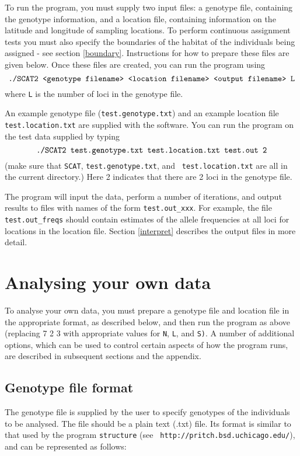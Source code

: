 \documentclass[11pt,titlepage,times,letterpaper]{article}
\begin{document}
To run the program, you must supply two input files: a genotype file,
containing the genotype information, and a location file, containing
information on the latitude and longitude of sampling locations. To
perform continuous assignment tests you must also specify the
boundaries of the habitat of the individuals being assigned - see
section \ref{boundary}.  Instructions for how to prepare these files
are given below. Once these files are created, you can run the program
using
$$\text{{\tt ./SCAT2 <genotype filename> <location filename> <output
filename> L}}$$ where {\tt L} is the number of loci in the genotype file.

An example genotype file ({\tt test.genotype.txt})
and an example location file {\tt test.location.txt} are supplied with
the software.  You can run the program on the test data supplied by
typing
$$\text{{\tt ./SCAT2 test.genotype.txt test.location.txt test.out 2}}$$ 
(make sure that {\tt SCAT}, {\tt test.genotype.txt}, and {\tt
test.location.txt} are all in the current directory.)  Here 2 indicates that there are 2
loci in the genotype file.

The program will input the data, perform a number of iterations, and
output results to files with names of the form {\tt test.out\_xxx}.
For example, the file {\tt test.out\_freqs} should contain estimates of the
allele frequencies at all loci for locations in the location file.
Section \ref{interpret} describes the output files in more detail.

\section{Analysing your own data}

To analyse your own data, you must prepare a genotype file and
location file in the appropriate format, as described below, and then
run the program as above (replacing 7 2 3 with appropriate values for
{\tt N}, {\tt L}, and {\tt S)}. A number of additional options, which
can be used to control certain aspects of how the program runs, are
described in subsequent sections and the appendix.

\subsection{Genotype file format}
\label{inputfile}

The genotype file is supplied by the user to specify genotypes of the
individuals to be analysed. The file should be a plain text (.txt) file.
Its format is similar to that
used by the program {\tt structure} (see {\tt
http://pritch.bsd.uchicago.edu/}), and can be represented as follows:
\end{document}
